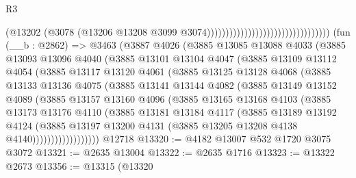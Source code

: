 \begin{lexlean}{R3}
\begin{coremodule}
                                                                (@13202
                                                                  (@3078
                                                                    (@13206
                                                                      @13208
                                                                      @3099
                                                                      @3074)))))))))))))))))))))))))))))))))
    (fun (__b : @2862) =>
    @3463
      (@3887
        @4026
        (@3885
          @13085
          @13088
          @4033
          (@3885
            @13093
            @13096
            @4040
            (@3885
              @13101
              @13104
              @4047
              (@3885
                @13109
                @13112
                @4054
                (@3885
                  @13117
                  @13120
                  @4061
                  (@3885
                    @13125
                    @13128
                    @4068
                    (@3885
                      @13133
                      @13136
                      @4075
                      (@3885
                        @13141
                        @13144
                        @4082
                        (@3885
                          @13149
                          @13152
                          @4089
                          (@3885
                            @13157
                            @13160
                            @4096
                            (@3885
                              @13165
                              @13168
                              @4103
                              (@3885
                                @13173
                                @13176
                                @4110
                                (@3885
                                  @13181
                                  @13184
                                  @4117
                                  (@3885
                                    @13189
                                    @13192
                                    @4124
                                    (@3885
                                      @13197
                                      @13200
                                      @4131
                                      (@3885 @13205 @13208 @4138 @4140))))))))))))))))))
    @12718
@13320 := @4182 @13007 @532 @1720 @3075 @3072
@13321 := @2635 @13004
@13322 := @2635 @1716
@13323 := @13322 @2673
@13356 := @13315
    (@13320

\end{coremodule}
\end{lexlean}

